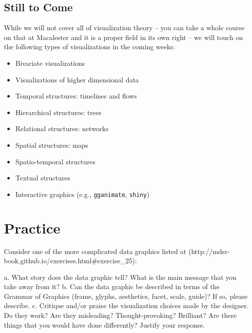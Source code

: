 \documentclass[
  letterpaper,
  DIV=11,
  numbers=noendperiod]{scrreprt}
\newenvironment{Shaded}{\begin{snugshade}}{\end{snugshade}}
\newcommand{\NormalTok}[1]{\textcolor[rgb]{0.00,0.23,0.31}{#1}}
\providecommand{\tightlist}{%
  \setlength{\itemsep}{0pt}\setlength{\parskip}{0pt}}\usepackage{longtable,booktabs,array}
\begin{document}
\subsection*{Still to Come}\label{still-to-come}

While we will not cover all of visualization theory -- you can take a
whole course on that at Macalester and it is a proper field in its own
right -- we will touch on the following types of visualizations in the
coming weeks:

\begin{itemize}
\tightlist
\item
  Bivariate visualizations
\item
  Visualizations of higher dimensional data
\item
  Temporal structures: timelines and flows
\item
  Hierarchical structures: trees
\item
  Relational structures: networks
\item
  Spatial structures: maps
\item
  Spatio-temporal structures
\item
  Textual structures
\item
  Interactive graphics (e.g., \texttt{gganimate}, \texttt{shiny})
\end{itemize}

\section*{Practice}\label{practice-2}


\begin{Shaded}
\begin{Highlighting}[]
\NormalTok{Consider one of the more complicated data graphics listed at (http://mdsr{-}book.github.io/exercises.html\#exercise\_25):}

\NormalTok{a. What story does the data graphic tell? What is the main message that you take away from it?}
\NormalTok{b. Can the data graphic be described in terms of the Grammar of Graphics (frame, glyphs, aesthetics, facet, scale, guide)? If so, please describe.}
\NormalTok{c. Critique and/or praise the visualization choices made by the designer. Do they work? Are they misleading? Thought{-}provoking? Brilliant? Are there things that you would have done differently? Justify your response.}
\end{Highlighting}
\end{Shaded}
\end{document}
